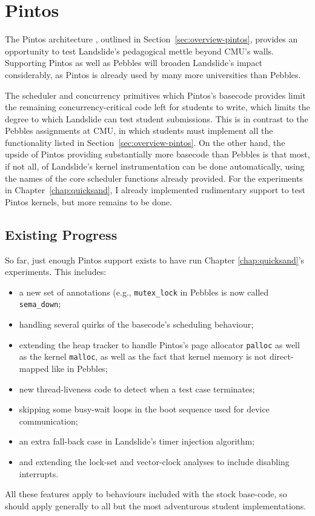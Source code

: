 \chapter{Pintos}
\label{chap:pintos}

The Pintos architecture \cite{pintos}, outlined in Section~\ref{sec:overview-pintos},
provides an opportunity to test Landslide's pedagogical mettle beyond CMU's walls.
Supporting Pintos as well as Pebbles will broaden Landslide's impact considerably,
as Pintos is already used by many more universities than Pebbles.

The scheduler and concurrency primitives which Pintos's basecode provides
limit the remaining concurrency-critical code left for students to write,
which limits the degree to which Landslide can test student submissions.
This is in contrast to the Pebbles assignments at CMU, in which students must implement all the functionality listed in Section~\ref{sec:overview-pintos}.
On the other hand, the upside of Pintos providing substantially more basecode than Pebbles
is that most, if not all, of Landslide's kernel instrumentation can be done automatically,
using the names of the core scheduler functions already provided.
For the experiments in Chapter~\ref{chap:quicksand}, I already implemented rudimentary support to test Pintos kernels, but more remains to be done.

\section{Existing Progress}

So far, just enough Pintos support exists to have run Chapter \ref{chap:quicksand}'s experiments. This includes:
\begin{itemize}
	\item a new set of annotations (e.g., {\tt mutex\_lock} in Pebbles is now called {\tt sema\_down};
	\item handling several quirks of the basecode's scheduling behaviour; %
	\item extending the heap tracker to handle Pintos's page allocator {\tt palloc} as well as the kernel {\tt malloc},
		as well as the fact that kernel memory is not direct-mapped like in Pebbles;
	\item new thread-liveness code to detect when a test case terminates;
	\item skipping some busy-wait loops in the boot sequence used for device communication;
	\item an extra fall-back case in Landslide's timer injection algorithm; %
	\item and extending the lock-set and vector-clock analyses to include disabling interrupts.
\end{itemize}
All these features apply to behaviours included with the stock base-code, so should apply generally to all but the most adventurous student implementations.

